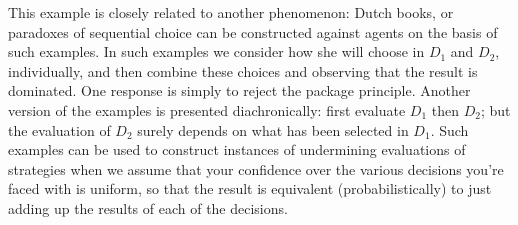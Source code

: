 \documentclass[a4paper]{article}
\newcommand\D{\mathcal{D}}
\renewcommand\S{\mathcal{S}}
\newcommand\s{\mathsf{s}}
\renewcommand\P{\mathbb{P}} %
\newcommand\EU{\mathrm{EU}}
\newcommand\U{\mathfrak{U}} %
\newcommand\Maximin{\Gamma}
\newcommand{\IB}{\mathbb{B}}
\newcommand{\IP}{\P}
\renewcommand{\color}[1]{}
\newcommand{\Strategies}{\mathcal{S}}
\newenvironment{CCM rewritten}
{\begingroup\color{blue}} %
{\endgroup}              %
\begin{document}
{\color{orange}
	This example is closely related to another phenomenon: Dutch books, or paradoxes of sequential choice can be constructed against agents on the basis of such examples. In such examples we consider how she will choose in $D_1$ and $D_2$, individually, and then combine these choices and observing that the result is dominated. One response is simply to reject the package principle. Another version of the examples is presented diachronically: first evaluate $D_1$ then $D_2$; but the evaluation of $D_2$ surely depends on what has been selected in $D_1$. 
Such examples can be used to construct instances of undermining evaluations of strategies when we assume that your confidence over the various decisions you're faced with is uniform, so that the result is equivalent (probabilistically) to just adding up the results of each of the decisions. 
}

%
%
%
\end{document}
